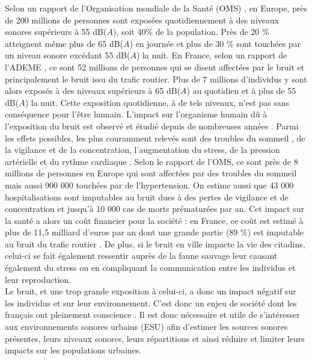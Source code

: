 Selon un rapport de l'Organisation mondiale de la Santé (OMS) \cite{who_burden_2017}, en Europe, près de 200 millions de personnes sont exposées quotidiennement à des niveaux sonores supérieurs à 55 dB($A$), soit 40$\%$ de la population. Près de 20 $\%$ atteignent même plus de 65 dB($A$) en journée et plus de 30 $\%$ sont touchées par un niveau sonore excédant 55 dB($A$) la nuit. En France, selon un rapport de l'ADEME \cite{europeens2016analyse}, ce sont 52 millions de personnes qui se disent affectées par le bruit et principalement le bruit issu du trafic routier. Plus de 7 millions d'individus y sont alors exposés à des niveaux supérieurs à 65 dB($A$) au quotidien et à plus de 55 dB($A$) la nuit.
Cette exposition quotidienne, à de tels niveaux, n'est pas sans conséquence pour l'être humain. L'impact sur l'organisme humain dû à l'exposition du bruit est observé et étudié depuis de nombreuses années \cite{ising1980health}. Parmi les effets possibles, les plus couramment relevés sont des troubles du sommeil \cite{pirrera2010nocturnal}, de la vigilance et de la concentration, l'augmentation du stress, de la pression artérielle et du rythme cardiaque \cite{babisch2008road, babisch2005traffic}. Selon le rapport de l'OMS, ce sont près de 8 millions de personnes en Europe qui sont affectées par des troubles du sommeil mais aussi 900 000 touchées par de l'hypertension. On estime aussi que 43 000 hospitalisations sont imputables au bruit dues à des pertes de vigilance et de concentration et jusqu'à 10 000 cas de morts prématurées par an. Cet impact sur la santé a alors un coût financier pour la société : en France, ce coût est estimé à plus de 11,5 milliard d'euros par an dont une grande partie (89 $\%$) est imputable au bruit du trafic routier \cite{europeens2016analyse}. De plus, si le bruit en ville impacte la vie des citadins, celui-ci se fait également ressentir auprès de la faune sauvage \cite{dutilleux_anthropogenic_2012, francis2009noise} leur causant également du stress ou en compliquant la communication entre les individus et leur reproduction.\\

Le bruit, et une trop grande exposition à celui-ci, a donc un impact négatif sur les individus et sur leur environnement. C'est donc un enjeu de société dont les français ont pleinement conscience \cite{JNA2016etude}.
Il est donc nécessaire et utile de s'intéresser aux environnements sonores urbains (ESU) afin d'estimer les sources sonores présentes, leurs niveaux sonores, leurs répartitions et ainsi réduire et limiter leurs impacts sur les populations urbaines.


